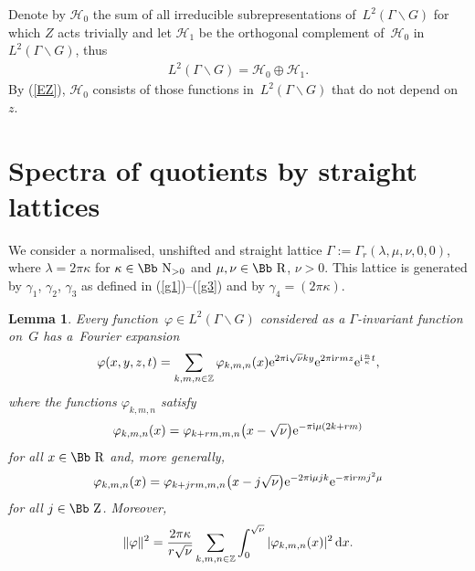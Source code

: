 \documentclass[10pt,a4paper]{amsart}
\newcommand\RR{{\mbox{\Bb R}}}
\newcommand\NN{{\mbox{\Bb N}}}
\newcommand\ZZ{{\mbox{\Bb Z}}}
\newcommand\Z{{\mathbb Z}}
\newcommand\cH{{\mathcal H}}
\newcommand\ph{\varphi}
\numberwithin{equation}{section}
\newtheorem{Lemma}[Theorem]{Lemma}
\begin{document}
Denote by $\cH_0$ the sum of all irreducible subrepresentations of~$L^2(\Gamma\backslash G)$ for which $Z$ acts trivially and let $\cH_1$ be the orthogonal complement of~$\cH_0$ in~$L^2(\Gamma\backslash G)$, thus
\begin{gather*}
L^2(\Gamma\backslash G)=\cH_0 \oplus \cH_1.
\end{gather*}
By (\ref{EZ}), $\cH_0$ consists of those functions in~$L^2(\Gamma\backslash G)$ that do not depend on~$z$.

\section{Spectra of quotients by straight lattices}
We consider a normalised, unshifted and straight lattice $\Gamma:=\Gamma_r(\lambda,\mu,\nu,0,0)$, where $\lambda=2\pi \kappa$ for $\kappa\in\NN_{>0}$ and $\mu,\nu\in\RR$, $\nu>0$. This lattice is generated by $\gamma_1$, $\gamma_2$, $\gamma_3$ as defined in (\ref{g1})--(\ref{g3}) and by $\gamma_4=(2\pi\kappa)$.
%
\begin{Lemma}
Every function~$\ph\in L^2(\Gamma\backslash G)$ considered as a $\Gamma$-invariant function on~$G$ has a~Fourier expansion
\begin{gather}\label{EF}
\varphi(x,y,z,t)=\sum_{k,m,n\in\Z}\varphi_{k,m,n}(x){\rm e}^{2\pi {\rm i}\sqrt\nu ky}{\rm e}^{2\pi {\rm i}rmz}{\rm e}^{{\rm i} \frac n\kappa t},
\end{gather}
where the functions $\ph_{k,m,n}$ satisfy
\begin{gather}\label{eq:varphikmn}
\varphi_{k,m,n}(x)=\varphi_{k+rm,m,n}\big(x-\sqrt\nu\big) {\rm e}^{-\pi {\rm i}\mu (2k+rm)}
\end{gather}
for all $x\in\RR$ and, more generally,
\begin{gather}\label{eq:varphikmn2}
\varphi_{k,m,n}(x)=\varphi_{k+jrm,m,n}\big(x-j\sqrt\nu\big) {\rm e}^{-2\pi {\rm i}\mu jk} {\rm e}^{-\pi {\rm i}rmj^2\mu}
\end{gather}
for all $j\in\ZZ$.
Moreover,
\begin{gather}\label{EL2}
\|\varphi\|^2 =\frac{2\pi \kappa}{r\sqrt\nu}\sum_{k,m,n\in\Z}\int_0^{\sqrt\nu}|\varphi_{k,m,n}(x)|^2\,{\rm d}x.
\end{gather}
\end{Lemma}
\end{document}
